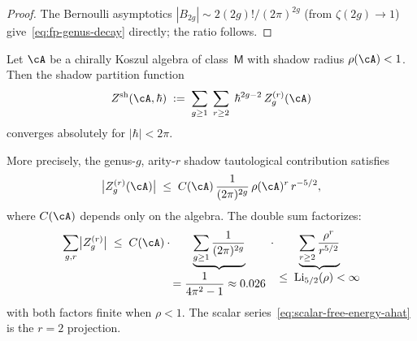 \begin{proof}
The Bernoulli asymptotics
$|B_{2g}| \sim 2(2g)!/(2\pi)^{2g}$ (from $\zeta(2g)\to 1$)
give~\eqref{eq:fp-genus-decay} directly; the ratio follows.
\end{proof}

\begin{theorem}
\label{thm:shadow-double-convergence}
Let $\cA$ be a chirally Koszul algebra of class~$\mathsf{M}$ with
shadow radius $\rho(\cA) < 1$.  Then the shadow partition function
\begin{equation}\label{eq:shadow-double-sum}
Z^{\mathrm{sh}}(\cA,\hbar)
\;:=\;
\sum_{g \geq 1}\;
\sum_{r \geq 2}\;
\hbar^{2g-2}\,
Z_g^{(r)}(\cA)
\end{equation}
converges absolutely for $|\hbar| < 2\pi$.

\smallskip
\noindent
More precisely, the genus-$g$, arity-$r$ shadow tautological
contribution satisfies
\begin{equation}\label{eq:shadow-double-bound}
\bigl|Z_g^{(r)}(\cA)\bigr|
\;\leq\;
C(\cA)\,
\frac{1}{(2\pi)^{2g}}\,
\rho(\cA)^r\,
r^{-5/2},
\end{equation}
where $C(\cA)$ depends only on the algebra.  The double sum factorizes:
\[
\sum_{g,r}
\bigl|Z_g^{(r)}\bigr|
\;\leq\;
C(\cA)
\cdot
\underbrace{\sum_{g \geq 1} \frac{1}{(2\pi)^{2g}}}_{\displaystyle
  = \frac{1}{4\pi^2-1} \approx 0.026}
\;\cdot\;
\underbrace{\sum_{r \geq 2} \frac{\rho^r}{r^{5/2}}}_{\displaystyle
  \leq\; \mathrm{Li}_{5/2}(\rho) < \infty}
\]
with both factors finite when $\rho < 1$.  The scalar
series~\eqref{eq:scalar-free-energy-ahat} is the $r=2$ projection.
\end{theorem}

